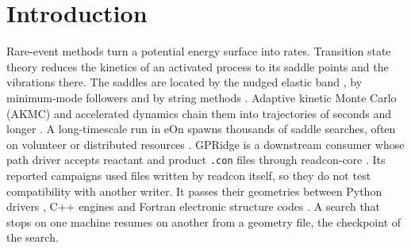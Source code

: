 \documentclass[preprint,12pt]{elsarticle}
\begin{document}
\section{Introduction}\label{sec:introduction} Rare-event methods turn a
potential energy surface into rates.
Transition state theory
\cite{eyringActivatedComplexChemical1935,vineyardFrequencyFactorsIsotope1957,hanggiReactionrateTheoryFifty1990}
reduces the kinetics of an activated process to its saddle points and
the vibrations there.
The saddles are located by the nudged elastic band
\cite{jonssonNudgedElasticBand1998,henkelmanClimbingImageNudged2000,henkelmanImprovedTangentEstimate2000,asgeirssonNudgedElasticBand2021},
by minimum-mode followers
\cite{henkelmanDimerMethodFinding1999,kastnerSuperlinearlyConvergingDimer2008,olsenComparisonMethodsFinding2004}
and by string methods
\cite{eStringMethodStudy2002,petersGrowingStringMethod2004}.
Adaptive kinetic Monte Carlo (AKMC) and accelerated dynamics chain them
into trajectories of seconds and longer
\cite{henkelmanLongTimeScale2001,xuAdaptiveKineticMonte2008,voterExtendingTimeScale2002,perezLongtimeDynamicsThrough2016}.
A long-timescale run in eOn
\cite{chillEonSoftwareLong2014,rohitgoswamiTheochemuieonV3602026} spawns
thousands of saddle searches, often on volunteer or distributed
resources
\cite{andersonBoincSystemPublicresource2004,pedersenDistributedImplementationAdaptive2010}.
GPRidge is a downstream consumer whose path driver accepts reactant and
product \texttt{.con} files through readcon-core
\cite{goswamiGpridgeGaussianprocessAccelerated2026}.
Its reported campaigns used files written by readcon itself, so they do
not test compatibility with another writer.
It passes their geometries between Python drivers
\cite{larsenAtomicSimulationEnvironmenta2017,hermesSellaOpensourceAutomationfriendly2022},
C++ engines and Fortran electronic structure codes
\cite{kresseEfficiencyAbinitioTotal1996}.
A search that stops on one machine resumes on another from a geometry
file, the checkpoint of the search.
\end{document}
